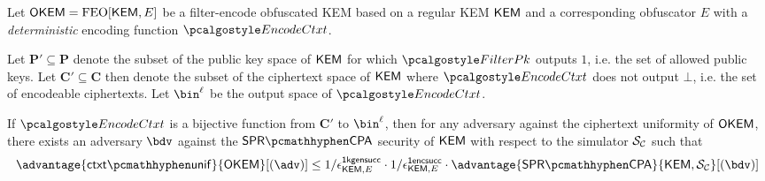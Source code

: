\begin{lemma}
\label{lem:ctxt-unif-for-bijections}
    Let $\mathsf{OKEM} = \textsf{\textnormal{FEO}}[\mathsf{KEM}, E]$ be a filter-encode obfuscated KEM based on a regular KEM $\mathsf{KEM}$ and a corresponding obfuscator $E$ with a \emph{deterministic} encoding function $\encodectxt$.

    Let $\mathbf{P}' \subseteq \mathbf{P}$ denote the subset of the public key space of $\mathsf{KEM}$ for which $\filterpk$ outputs $1$, i.e. the set of allowed public keys.
    Let $\mathbf{C}' \subseteq \mathbf{C}$ then denote the subset of the ciphertext space of $\mathsf{KEM}$ where $\encodectxt$ does not output $\bot$, i.e. the set of encodeable ciphertexts.
    Let $\bin^\ell$ be the output space of $\encodectxt$.

    If $\encodectxt$ is a bijective function from $\mathbf{C}'$ to $\bin^\ell$, then for any adversary against the ciphertext uniformity of $\mathsf{OKEM}$, there exists an adversary $\bdv$ against the $\sprcpa$ security of $\mathsf{KEM}$ with respect to the simulator $\mathcal{S}_\mathcal{C}$ such that
    \[
        \advantage{\ctxtunif}{\OKEM}[(\adv)]
        \leq 1/\epsilon^\firstkeygensuccess_{\KEM,E}
        \cdot 1/\epsilon^\firstencapssuccess_{\KEM,E}
        \cdot \advantage{\sprcpa}{\KEM,\simulunif}[(\bdv)]
    \]
\end{lemma}
